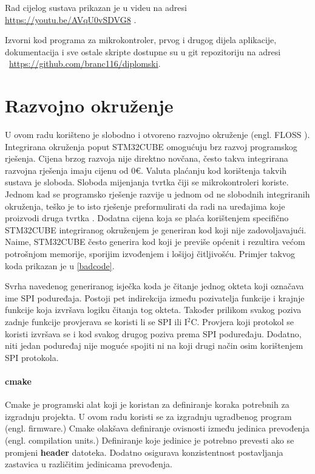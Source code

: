 \documentclass[times, utf8, diplomski]{diplomski}
\begin{document}
Rad cijelog sustava prikazan je u videu na adresi \url{https://youtu.be/AVqU0vSDVG8} \cite{videodemo}.

Izvorni kod programa za mikrokontroler, prvog i drugog dijela aplikacije, dokumentacija i sve ostale skripte dostupne su u git repozitoriju na adresi \ \url{https://github.com/branc116/diplomski}.

\newpage

\chapter{Razvojno okruženje}
U ovom radu korišteno je slobodno i otvoreno razvojno okruženje (engl. FLOSS \cite{FLOSS}). Integrirana okruženja poput STM32CUBE omogućuju brz razvoj programskog rješenja. Cijena brzog razvoja nije direktno novčana, često takva integrirana razvojna rješenja imaju cijenu od 0€. Valuta plaćanju kod korištenja takvih sustava je sloboda. Sloboda mijenjanja tvrtka čiji se mikrokontroleri koriste. Jednom kad se programsko rješenje razvije u jednom od ne slobodnih integriranih okruženja, teško je to isto rješenje preformulirati da radi na uređajima koje proizvodi druga tvrtka \cite{VENDORLOCKIN}. Dodatna cijena koja se plaća korištenjem specifično STM32CUBE integriranog okruženjem je generiran kod koji nije zadovoljavajući. Naime, STM32CUBE često generira kod koji je previše općenit i rezultira većom potrošnjom memorije, sporijim izvođenjem i lošijoj čitljivošću. Primjer takvog koda prikazan je u \ref{badcode}.



Svrha navedenog generiranog isječka koda je čitanje jednog okteta koji označava ime SPI poduređaja. Postoji pet indirekcija između pozivatelja funkcije i krajnje funkcije koja izvršava logiku čitanja tog okteta. Također prilikom svakog poziva zadnje funkcije provjerava se koristi li se SPI ili I\(^2\)C. Provjera koji protokol se koristi izvršava se i kod svakog drugog poziva prema SPI poduređaju. Dodatno, niti jedan poduređaj nije moguće spojiti ni na koji drugi način osim korištenjem SPI protokola.

\subsubsection{cmake}
Cmake je programski alat koji je koristan za definiranje koraka potrebnih za izgradnju projekta. U ovom radu koristi se za izgradnju ugradbenog program (engl. firmware.) Cmake olakšava definiranje ovisnosti između jedinica prevođenja (engl. compilation units.) Definiranje koje jedinice je potrebno prevesti ako se promjeni \textbf{header} datoteka. Dodatno osigurava konzistentnost postavljanja zastavica u različitim jedinicama prevođenja.
\end{document}
